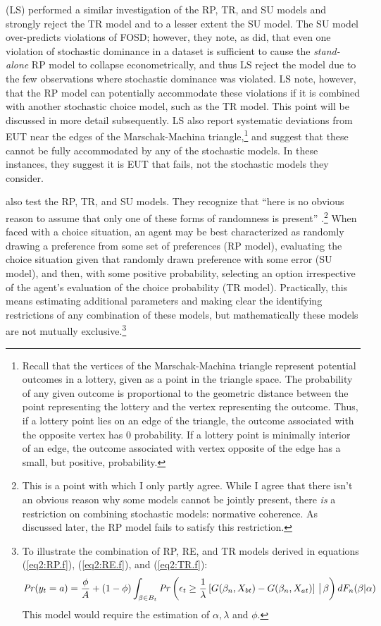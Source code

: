 \documentclass[../main.tex]{subfiles}
\begin{document}
\textcite{Loomes1998} (LS) performed a similar investigation of the RP, TR, and SU models and strongly reject the TR model and to a lesser extent the SU model.
The SU model over-predicts violations of FOSD; however, they note, as \textcite{Carbone1997} did, that even one violation of stochastic dominance in a dataset is sufficient to cause the \textit{stand-alone} RP model to collapse econometrically, and thus LS reject the model due to the few observations where stochastic dominance was violated.
LS note, however, that the RP model can potentially accommodate these violations if it is combined with another stochastic choice model, such as the TR model.
This point will be discussed in more detail subsequently.
LS also report systematic deviations from EUT near the edges of the Marschak-Machina triangle,\footnote{
	Recall that the vertices of the Marschak-Machina triangle represent potential outcomes in a lottery, given as a point in the triangle space.
	The probability of any given outcome is proportional to the geometric distance between the point representing the lottery and the vertex representing the outcome.
	Thus, if a lottery point lies on an edge of the triangle, the outcome associated with the opposite vertex has 0 probability.
	If a lottery point is minimally interior of an edge, the outcome associated with vertex opposite of the edge has a small, but positive, probability.} and suggest that these cannot be fully accommodated by any of the stochastic models.
In these instances, they suggest it is EUT that fails, not the stochastic models they consider.

\textcite{Loomes2002} also test the RP, TR, and SU models.
They recognize that \enquote{here is no obvious reason to assume that only one of these forms of randomness is present} \parencite*[106]{Loomes2002}.\footnote{
	This is a point with which I only partly agree.
	While I agree that there isn't an obvious reason why some models cannot be jointly present, there \textit{is} a restriction on combining stochastic models: normative coherence.
	As discussed later, the RP model fails to satisfy this restriction.}
When faced with a choice situation, an agent may be best characterized as randomly drawing a preference from some set of preferences (RP model), evaluating the choice situation given that randomly drawn preference with some error (SU model), and then, with some positive probability, selecting an option irrespective of the agent's evaluation of the choice probability (TR model).
Practically, this means estimating additional parameters and making clear the identifying restrictions of any combination of these models, but mathematically these models are not mutually exclusive.\footnote{
	To illustrate the combination of RP, RE, and TR models derived in equations (\ref{eq2:RP.f}), (\ref{eq2:RE.f}), and (\ref{eq2:TR.f}):
	\begin{align*}
		{\ensuremath{\mathit{Pr}}}(y_t=a) = \frac{\phi}{A} + (1-\phi)\int_{\beta \in B_t}  {\mathit{Pr}}\left(  \epsilon_t \geq \frac{1}{\lambda} \left[ G(\beta_n,X_{bt}) - G(\beta_n,X_{at}) \right] \,\big|\, \beta \right) dF_n(\beta|\alpha)
	\end{align*}
	This model would require the estimation of $\alpha, \lambda$ and $\phi$.}
\end{document}
